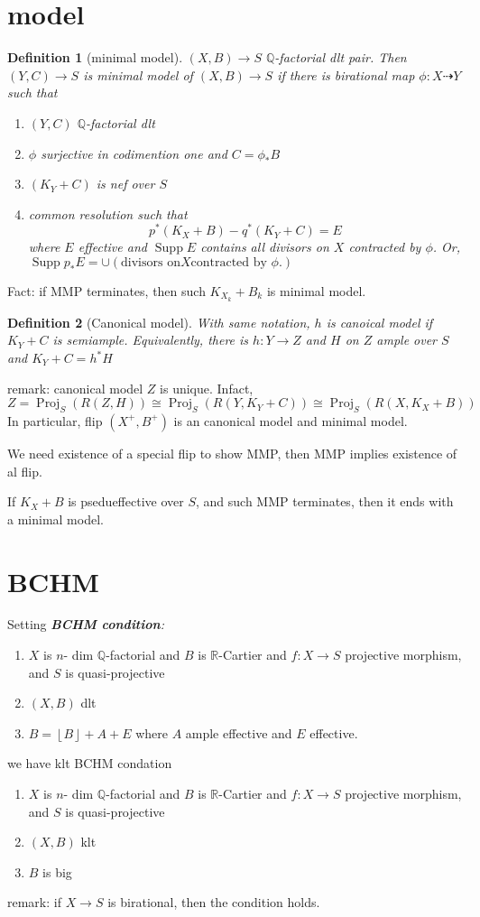\documentclass{article}
\newtheorem{defn}{Definition}[section]
\begin{document}
\section{ model}
\begin{defn}[minimal model]
  
$(X,B)\to S$ $\mathbb{Q}$-factorial dlt pair. Then $(Y,C)\to S$ is minimal model of $(X,B)\to S$ if there is birational map  $\phi:X \dashrightarrow  Y$ such that 
\begin{enumerate}
  \item $(Y,C)$ $\mathbb{Q}$-factorial dlt
  \item $\phi$ surjective in codimention one and $C=\phi_*B$
  \item $(K_{Y}+C)$ is nef over $S$ 
  \item common resolution such that 
    \[
      p^*(K_{X}+B)-q^*(K_{Y}+C)=E
    \]
    where $E$ effective and $\operatorname{Supp}E$ contains all divisors on $X$ contracted by $\phi$. Or, $\operatorname{Supp}p_*E= \cup (\text{divisors on} X \text{contracted by } \phi.)$   
\end{enumerate}
\end{defn}
Fact: if MMP terminates, then such $K_{X_{k}}+B_{k}$ is minimal model.
\begin{defn}[Canonical model]
  With same notation, $h$ is canoical model if  $K_{Y}+C$ is semiample. Equivalently, there is $h:Y\to Z$ and $H$ on $Z$ ample over $S$ and $K_{Y}+C=h^*H$
\end{defn}
remark: canonical model $Z$ is unique. Infact, 
\[
  Z=\operatorname{Proj}_{S}(R(Z,H))\cong \operatorname{Proj}_{S}(R(Y,K_{Y}+C))\cong\operatorname{Proj}_{S}(R(X,K_{X}+B))
\]
In particular, flip $(X^+,B^+)$ is an canonical model and minimal model.

We need existence of a special flip to show MMP, then MMP implies existence of al flip. 

If $K_{X}+B$ is psedueffective over  $S$, and such MMP terminates, then it ends with a minimal model.
\section{BCHM}
Setting \emph{\textbf{BCHM condition}: } 
\begin{enumerate}
  \item $X$ is $n$- dim $\mathbb{Q}$-factorial and $B$ is $\mathbb{R}$-Cartier and $f:X\to S$ projective morphism, and $S$ is quasi-projective
  \item $(X,B)$ dlt
  \item $B=  \left\lfloor B \right\rfloor +A+E$ where $A$ ample effective and $E$ effective. 

\end{enumerate}
we have klt BCHM condation
\begin{enumerate}
  \item $X$ is $n$- dim $\mathbb{Q}$-factorial and $B$ is $\mathbb{R}$-Cartier and $f:X\to S$ projective morphism, and $S$ is quasi-projective
  \item $(X,B)$ klt
  \item $B $ is big
\end{enumerate}
remark: if $X\to S$ is birational, then the condition holds.
\end{document}
